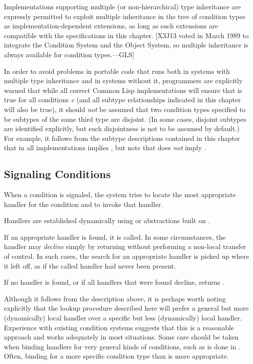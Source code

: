 Implementations supporting multiple (or non-hierarchical) type inheritance
are expressly permitted to exploit multiple inheritance in the tree of
condition types as implementation-dependent extensions, as long as such
extensions are compatible with the specifications in this chapter.
[X3J13 voted in March 1989 
to integrate the Condition System and the Object System,
so multiple inheritance is always available for condition types.---GLS]

In order to avoid problems in portable code that runs both in systems with
multiple type inheritance and in systems without it, programmers are explicitly
warned that while all correct Common Lisp implementations will ensure that
is true for all conditions {\it c} (and all subtype relationships indicated in this
chapter will also be true), it should {\it not} be assumed that two condition
types specified to be subtypes of the same third type are disjoint.
(In some cases,
disjoint subtypes are identified explicitly, but such disjointness is not to be assumed by
default.)  For example, it follows from the subtype descriptions contained in
this chapter that in all implementations
 implies ,
but note that
 does {\it not}
imply .


\subsection{Signaling Conditions}

When a condition is signaled, the system tries to locate the most appropriate
handler for the condition and to invoke that handler.

Handlers are established dynamically using  or abstractions built
on .

If an appropriate handler is found, it is called. In some circumstances, 
the handler may {\it decline} simply by returning without performing a 
non-local transfer of control. In such cases, the search for an 
appropriate handler is picked up where it left off, as if the called 
handler had never been present.

If no handler is found, or if all handlers that were found decline,
 returns .

Although it follows from the description above, it is perhaps worth noting
explicitly that the lookup procedure described here will prefer a general 
but more (dynamically) local handler over a specific but less (dynamically)
local handler. Experience with existing condition systems suggests that
this is a reasonable approach and works adequately in most situations. 
Some care should be taken when binding handlers for very general kinds of
conditions, such as is done in . Often, binding for a more
specific condition type than  is more appropriate.


